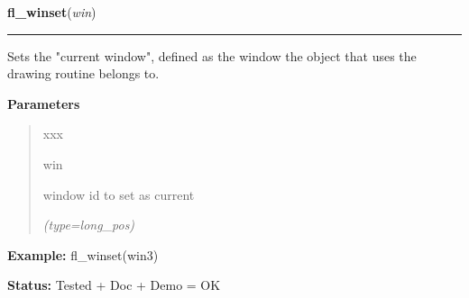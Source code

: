 \hspace{.8\funcindent}\begin{boxedminipage}{\funcwidth}

    \raggedright \textbf{fl\_winset}(\textit{win})

    \vspace{-1.5ex}

    \rule{\textwidth}{0.5\fboxrule}
\setlength{\parskip}{2ex}
    Sets the "current window", defined as the window the object that uses 
    the drawing routine belongs to.

\setlength{\parskip}{1ex}
      \textbf{Parameters}
      \vspace{-1ex}

      \begin{quote}
        \begin{Ventry}{xxx}

          \item[win]

          window id to set as current

            {\it (type=long\_pos)}

        \end{Ventry}

      \end{quote}

\textbf{Example:} fl\_winset(win3)



\textbf{Status:} Tested + Doc + Demo = OK



    \end{boxedminipage}

    \label{xformslib:flxbasic:fl_winreparent}

    \vspace{0.5ex}

